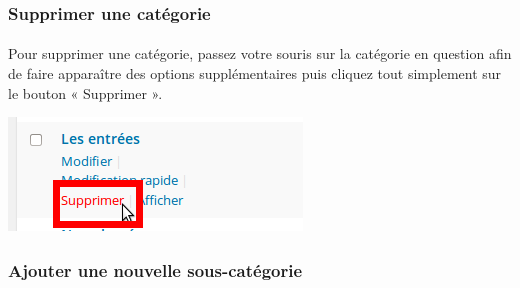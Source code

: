 \documentclass[10pt,a4paper]{article}
\begin{document}
\subsubsection{Supprimer une catégorie}
\paragraph{}Pour supprimer une catégorie, passez votre souris sur la catégorie en question afin de faire apparaître des options supplémentaires puis cliquez tout simplement sur le bouton « Supprimer ».
\begin{center}
\includegraphics[scale=0.3]{img/0092.png}
\end{center}
\subsubsection{Ajouter une nouvelle sous-catégorie}
\end{document}

